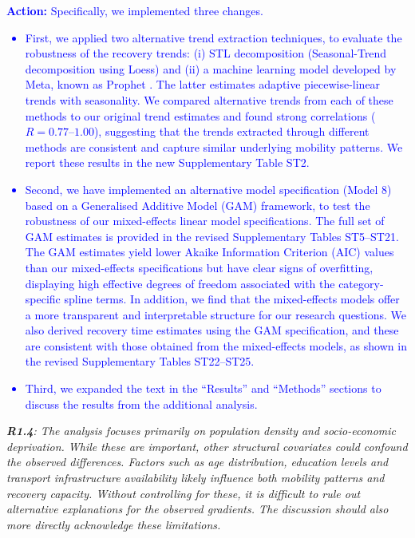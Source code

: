 \documentclass[12pt,a4paper,oneside, reqno]{amsart}
\begin{document}
\textcolor{blue}{
\textbf{Action:} Specifically, we implemented three changes. 
\begin{itemize}[noitemsep, topsep=0pt]
    \item First, we applied two alternative trend extraction techniques, to evaluate the robustness of the recovery trends: (i) STL decomposition (Seasonal-Trend decomposition using Loess) \parencite{cleveland1990stl} and (ii) a machine learning model developed by Meta, known as Prophet \parencite{prophet17}. The latter estimates adaptive piecewise-linear trends with seasonality. We compared alternative trends from each of these methods to our original trend estimates and found strong correlations ($R = 0.77–1.00$), suggesting that the trends extracted through different methods are consistent and capture similar underlying mobility patterns. We report these results in the new Supplementary Table ST2.
    \item Second, we have implemented an alternative model specification (Model 8) based on a Generalised Additive Model (GAM) framework, to test the robustness of our mixed-effects linear model specifications. The full set of GAM estimates is provided in the revised Supplementary Tables ST5–ST21. The GAM estimates yield lower Akaike Information Criterion (AIC) values than our mixed-effects specifications but have clear signs of overfitting, displaying high effective degrees of freedom associated with the category-specific spline terms. In addition, we find that the mixed-effects models offer a more transparent and interpretable structure for our research questions. We also derived recovery time estimates using the GAM specification, and these are consistent with those obtained from the mixed-effects models, as shown in the revised Supplementary Tables ST22–ST25. 
    \item Third, we expanded the text in the ``Results'' and ``Methods'' sections to discuss the results from the additional analysis.
\end{itemize}
}

\setlength{\leftskip}{0cm} \textit{\textbf{R1.4}: The analysis focuses primarily on population density and socio-economic deprivation. While these are important, other structural covariates could confound the observed differences. Factors such as age distribution, education levels and transport infrastructure availability likely influence both mobility patterns and recovery capacity. Without controlling for these, it is difficult to rule out alternative explanations for the observed gradients. The discussion should also more directly acknowledge these limitations.
}
\end{document}
